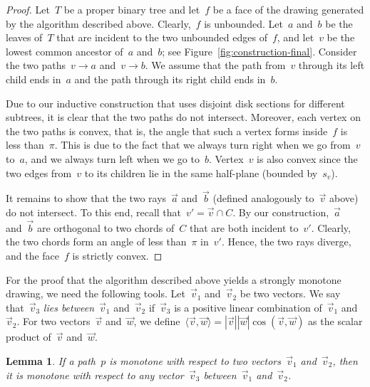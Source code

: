\documentclass[a4paper,11pt]{article}
\theoremstyle{plain}
\newtheorem{lemma}{Lemma}
\begin{document}
\begin{proof}
  Let~$T$ be a proper binary tree and let~$f$ be a face of the
  drawing generated by the algorithm described above.  Clearly,~$f$ is
  unbounded.  Let~$a$ and~$b$ be the leaves of~$T$ that are incident
  to the two unbounded edges of~$f$, and let~$v$ be the lowest common
  ancestor of~$a$ and~$b$; see Figure~\ref{fig:construction-final}.
  Consider the two paths~$v\to a$ and~$v\to b$.  
  We assume that the path from~$v$ through its left child
  ends in~$a$ and the path through its right child ends in~$b$.

  Due to our inductive construction that uses disjoint disk sections
  for different subtrees, it is clear that the two paths do not
  intersect.  Moreover, each vertex on the two paths is convex, that
  is, the angle that such a vertex forms inside~$f$ is less
  than~$\pi$.  This is due to the fact that we always turn right when
  we go from~$v$ to~$a$, and we always turn left when we go to~$b$.
  Vertex~$v$ is also convex since the two edges from~$v$ to its
  children lie in the same half-plane (bounded by~$s_v$).
  
  It remains to show that the two rays~$\vec{a}$ and~$\vec{b}$
  (defined analogously to~$\vec{v}$ above) do not intersect.  To this
  end, recall that~$v'=\vec{v} \cap C$.  By our construction,~$\vec{a}$
  and~$\vec{b}$ are orthogonal to two chords of~$C$ that are
  both incident to~$v'$.  Clearly, the two chords form an angle of
  less than~$\pi$ in~$v'$.  Hence, the two rays diverge, and the
  face~$f$ is strictly convex.
\end{proof}
  
For the proof that the algorithm described above yields a strongly monotone 
drawing, we need the following tools. Let~$\vec v_1$ and~$\vec v_2$ be two 
vectors. We say that~$\vec v_3$ \emph{lies between}~$\vec v_1$ and~$\vec v_2$ 
if~$\vec v_3$ is a positive linear combination of~$\vec v_1$ and~$\vec v_2$.
For two vectors~$\vec v$ and~$\vec w$, we 
define~$\langle \vec v,\vec w\rangle=|\vec v||\vec w|\cos(\vec v,\vec w)$ as the 
scalar product of~$\vec v$ and~$\vec w$.

\begin{lemma}\label{lem:between}
  If a path~$p$ is monotone with respect to two vectors~$\vec v_1$ 
  and~$\vec v_2$, then it is monotone with respect to any vector~$\vec v_3$
  between~$\vec v_1$ and~$\vec v_2$.
\end{lemma}
\end{document}
